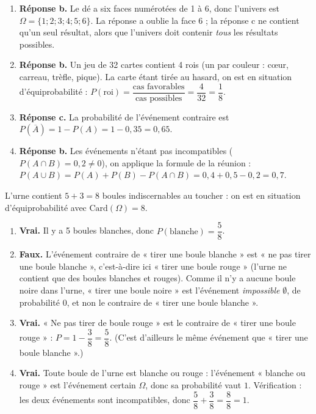 \documentclass[11pt]{article}
\begin{document}
\begin{corrige}
\begin{enumerate}
\item \textbf{Réponse b.} Le dé a six faces numérotées de 1 à 6, donc l'univers est $\Omega = \{1 ; 2 ; 3 ; 4 ; 5 ; 6\}$. La réponse a oublie la face 6 ; la réponse c ne contient qu'un seul résultat, alors que l'univers doit contenir \emph{tous} les résultats possibles.
\item \textbf{Réponse b.} Un jeu de 32 cartes contient 4 rois (un par couleur : cœur, carreau, trèfle, pique). La carte étant tirée au hasard, on est en situation d'équiprobabilité : $P(\text{roi}) = \dfrac{\text{cas favorables}}{\text{cas possibles}} = \dfrac{4}{32} = \dfrac{1}{8}$.
\item \textbf{Réponse c.} La probabilité de l'événement contraire est $P(\overline{A}) = 1 - P(A) = 1 - 0{,}35 = 0{,}65$.
\item \textbf{Réponse b.} Les événements n'étant pas incompatibles ($P(A \cap B) = 0{,}2 \neq 0$), on applique la formule de la réunion : $P(A \cup B) = P(A) + P(B) - P(A \cap B) = 0{,}4 + 0{,}5 - 0{,}2 = 0{,}7$.
\end{enumerate}
\end{corrige}

\begin{corrige}
L'urne contient $5 + 3 = 8$ boules indiscernables au toucher : on est en situation d'équiprobabilité avec $\text{Card}(\Omega) = 8$.
\begin{enumerate}
\item \textbf{Vrai.} Il y a 5 boules blanches, donc $P(\text{blanche}) = \dfrac{5}{8}$.
\item \textbf{Faux.} L'événement contraire de « tirer une boule blanche » est « ne pas tirer une boule blanche », c'est-à-dire ici « tirer une boule rouge » (l'urne ne contient que des boules blanches et rouges). Comme il n'y a aucune boule noire dans l'urne, « tirer une boule noire » est l'événement \emph{impossible} $\emptyset$, de probabilité $0$, et non le contraire de « tirer une boule blanche ».
\item \textbf{Vrai.} « Ne pas tirer de boule rouge » est le contraire de « tirer une boule rouge » : $P = 1 - \dfrac{3}{8} = \dfrac{5}{8}$. (C'est d'ailleurs le même événement que « tirer une boule blanche ».)
\item \textbf{Vrai.} Toute boule de l'urne est blanche ou rouge : l'événement « blanche ou rouge » est l'événement certain $\Omega$, donc sa probabilité vaut $1$. Vérification : les deux événements sont incompatibles, donc $\dfrac{5}{8} + \dfrac{3}{8} = \dfrac{8}{8} = 1$.
\end{enumerate}
\end{corrige}
\end{document}
